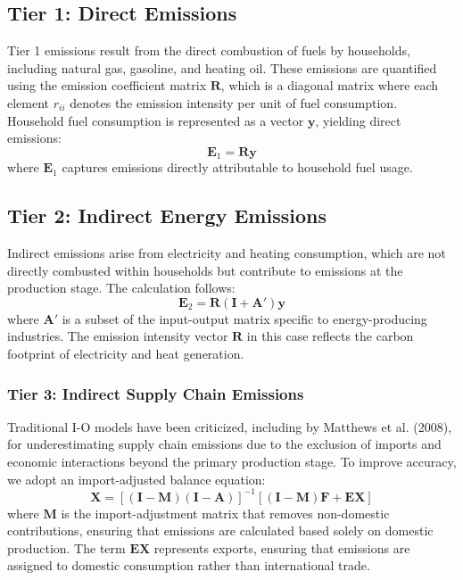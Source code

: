 \documentclass[12pt,a4paper]{article}%
\begin{document}
\subsection{Tier 1: Direct Emissions}
Tier 1 emissions result from the direct combustion of fuels by households, including natural gas, gasoline, and heating oil. These emissions are quantified using the emission coefficient matrix \( \mathbf{R} \), which is a diagonal matrix where each element \( r_{ii} \) denotes the emission intensity per unit of fuel consumption. Household fuel consumption is represented as a vector \( \mathbf{y} \), yielding direct emissions:
\begin{equation}
    \mathbf{E}_1 = \mathbf{R} \mathbf{y}
\end{equation}
where \( \mathbf{E}_1 \) captures emissions directly attributable to household fuel usage.

\subsection{Tier 2: Indirect Energy Emissions}
Indirect emissions arise from electricity and heating consumption, which are not directly combusted within households but contribute to emissions at the production stage. The calculation follows:
\begin{equation}
    \mathbf{E}_2 = \mathbf{R} (\mathbf{I} + \mathbf{A}') \mathbf{y}
\end{equation}
where \( \mathbf{A}' \) is a subset of the input-output matrix specific to energy-producing industries. The emission intensity vector \( \mathbf{R} \) in this case reflects the carbon footprint of electricity and heat generation.

\subsubsection*{Tier 3: Indirect Supply Chain Emissions}
Traditional I-O models have been criticized, including by Matthews et al. (2008), for underestimating supply chain emissions due to the exclusion of imports and economic interactions beyond the primary production stage. To improve accuracy, we adopt an import-adjusted balance equation:
\begin{equation}
    \mathbf{X} = {[(\mathbf{I} - \mathbf{M}) (\mathbf{I} - \mathbf{A})]}^{-1} [(\mathbf{I} - \mathbf{M}) \mathbf{F} + \mathbf{EX}]
\end{equation}
where \( \mathbf{M} \) is the import-adjustment matrix that removes non-domestic contributions, ensuring that emissions are calculated based solely on domestic production. The term \( \mathbf{EX} \) represents exports, ensuring that emissions are assigned to domestic consumption rather than international trade.
\end{document}
